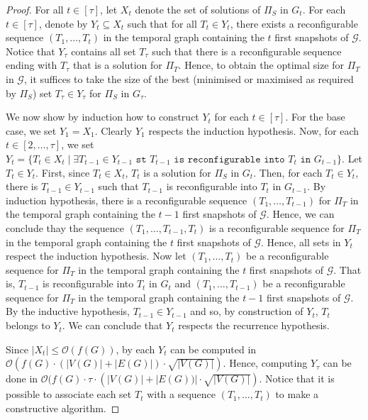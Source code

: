 \begin{proof}
  For all $t \in [\tau]$, let $X_t$ denote the set of solutions of $\Pi_S$ in $G_t$. For each $t \in [\tau]$, denote by $Y_t \subseteq X_t$ such that for all $T_t \in Y_t$, there exists a reconfigurable sequence $(T_1,\dots,T_t)$  in the temporal graph containing the $t$ first snapshots of $\mathcal{G}$.
  Notice that $Y_\tau$ contains all set $T_\tau$ such that there is a reconfigurable sequence ending with $T_\tau$ that is a solution for $\Pi_T$. Hence, to obtain the optimal size for $\Pi_T$ in $\mathcal{G}$, it suffices to take the size of the best (minimised or maximised as required by $\Pi_S$) set  $T_\tau \in Y_\tau$ for $\Pi_S$ in $G_\tau$.
  
  We now show by induction how to construct $Y_t$ for each $t \in [\tau]$.
  For the base case, we set $Y_1 = X_1$. Clearly $Y_1$ respects the induction hypothesis.
  Now, for each $t \in [2,\dots,\tau]$, we set $Y_t = \{ T_t \in X_t \mid \exists T_{t-1} \in Y_{t-1} \texttt{ st $T_{t-1}$ is reconfigurable into $T_t$ in $G_{t-1}$}\}$. Let $T_t \in Y_t$. First, since $T_t \in X_t$, $T_t$ is a solution for $\Pi_S$ in $G_t$. Then, for each $T_t \in Y_t$, there is $T_{t-1} \in Y_{t-1}$ such that $T_{t-1}$ is reconfigurable into $T_t$ in $G_{t-1}$. By induction hypothesis, there is a reconfigurable sequence $(T_1,\dots,T_{t-1})$ for $\Pi_T$ in the temporal graph containing the $t-1$ first snapshots of $\mathcal{G}$. Hence, we can conclude thay the sequence $(T_1,\dots,T_{t-1},T_t)$ is a reconfigurable sequence for $\Pi_T$ in the temporal graph containing the $t$ first snapshots of $\mathcal{G}$. Hence, all sets in $Y_t$ respect the induction hypothesis.
  Now let $(T_1,\dots,T_t)$ be a reconfigurable sequence for $\Pi_T$ in the temporal graph containing the $t$ first snapshots of $\mathcal{G}$. That is, $T_{t-1}$ is reconfigurable into $T_t$ in $G_t$ and $(T_1,\dots,T_{t-1})$ be a reconfigurable sequence for $\Pi_T$ in the temporal graph containing the $t-1$ first snapshots of $\mathcal{G}$. By the inductive hypothesis, $T_{t-1} \in Y_{t-1}$ and so, by construction of $Y_t$, $T_t$ belongs to $Y_t$. We can conclude that $Y_t$ respects the recurrence hypothesis.
  
  Since $|X_t| \leq \mathcal{O}(f(G))$, by  each $Y_t$ can be computed in $\mathcal{O}(f(G)\cdot (|V(G)| + |E(G)|)\cdot \sqrt{|V(G)|})$. Hence, computing $Y_\tau$ can be done in $\mathcal{O}(f(G)\cdot \tau \cdot (|V(G)| + |E(G))|\cdot \sqrt{|V(G)|})$. Notice that it is possible to associate each set $T_t$ with a sequence $(T_1,\dots,T_t)$ to make a constructive algorithm.
\end{proof}


